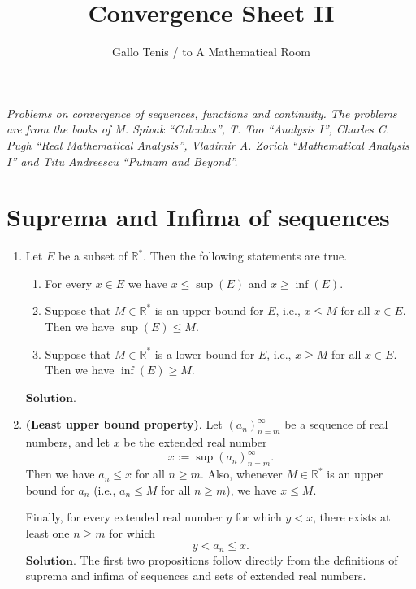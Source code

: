 \documentclass{article}
\title{Convergence Sheet II}
\author{Gallo Tenis / to A Mathematical Room}
\theoremstyle{remark}
\begin{document}
\maketitle

\begin{center}
    \textit{Problems on convergence of sequences, functions and continuity. The problems are from the books of M. Spivak ``Calculus'', T. Tao ``Analysis I'', Charles C. Pugh ``Real Mathematical Analysis'',
    Vladimir A. Zorich ``Mathematical Analysis I''
    and Titu Andreescu ``Putnam and Beyond''.}
\end{center}
\section*{Suprema and Infima of sequences}
    \begin{enumerate}
        \item Let \( E \) be a subset of \( \mathbb{R}^* \). Then the following statements are true.

        \begin{enumerate}
            \item[(a)] For every \( x \in E \) we have \( x \leq \sup(E) \) and \( x \geq \inf(E) \).
        
            \item[(b)] Suppose that \( M \in \mathbb{R}^* \) is an upper bound for \( E \), i.e., \( x \leq M \) for all \( x \in E \). Then we have \(\sup(E) \leq M\).
        
            \item[(c)] Suppose that \( M \in \mathbb{R}^* \) is a lower bound for \( E \), i.e., \( x \geq M \) for all \( x \in E \). Then we have \(\inf(E) \geq M\).
        \end{enumerate}
        $\textbf{Solution.}$


        \item \textbf{(Least upper bound property)}. Let
        \( (a_n)_{n=m}^{\infty} \) be a sequence of real numbers, and let
        \( x \) be the extended real number
        \[
        x := \sup (a_n)_{n=m}^{\infty}.
        \]
        Then we have \( a_n \leq x \) for all \( n \geq m \). Also,
        whenever \( M \in \mathbb{R}^* \) is an upper bound for \( a_n \)
        (i.e., \( a_n \leq M \) for all \( n \geq m \)), we have \( x \leq M \).
        
        Finally, for every extended real number \( y \) for which \( y < x \),
        there exists at least one \( n \geq m \) for which
        \[
        y < a_n \leq x.
        \]
        $\textbf{Solution.}$
        The first two propositions follow directly from the definitions of suprema and infima of sequences and sets 
        of extended real numbers.


\end{enumerate}
\end{document}
